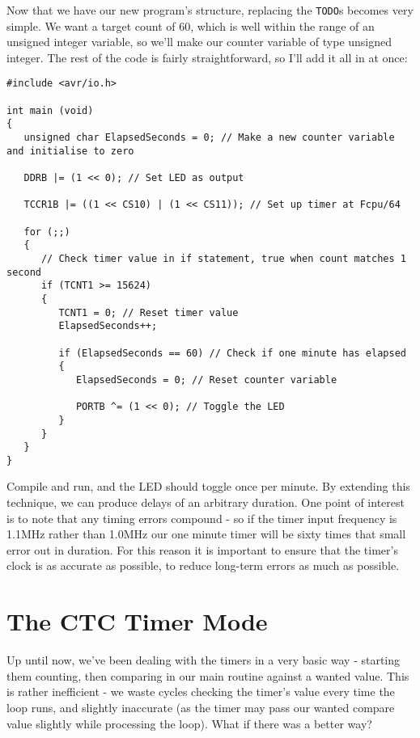 \documentclass[a4paper,oneside]{book}
\begin{document}
Now that we have our new program's structure, replacing the \texttt{TODO}s becomes very simple. We want a target count of 60, which is well within the range of an unsigned integer variable, so we'll make our counter variable of type unsigned integer. The rest of the code is fairly straightforward, so I'll add it all in at once:

\begin{center}
\begin{lstlisting}
#include <avr/io.h>

int main (void)
{
   unsigned char ElapsedSeconds = 0; // Make a new counter variable and initialise to zero

   DDRB |= (1 << 0); // Set LED as output

   TCCR1B |= ((1 << CS10) | (1 << CS11)); // Set up timer at Fcpu/64

   for (;;)
   {
      // Check timer value in if statement, true when count matches 1 second
      if (TCNT1 >= 15624)
      {
         TCNT1 = 0; // Reset timer value
         ElapsedSeconds++;

         if (ElapsedSeconds == 60) // Check if one minute has elapsed
         {
            ElapsedSeconds = 0; // Reset counter variable

            PORTB ^= (1 << 0); // Toggle the LED
         }
      }
   }
} 
\end{lstlisting}
\end{center}

Compile and run, and the LED should toggle once per minute. By extending this technique, we can produce delays of an arbitrary duration. One point of interest is to note that any timing errors compound - so if the timer input frequency is 1.1MHz rather than 1.0MHz our one minute timer will be sixty times that small error out in duration. For this reason it is important to ensure that the timer's clock is as accurate as possible, to reduce long-term errors as much as possible.


\label{chp:CTCMode}
\chapter{The CTC Timer Mode}

Up until now, we've been dealing with the timers in a very basic way - starting them counting, then comparing in our main routine against a wanted value. This is rather inefficient - we waste cycles checking the timer's value every time the loop runs, and slightly inaccurate (as the timer may pass our wanted compare value slightly while processing the loop). What if there was a better way?
\end{document}
